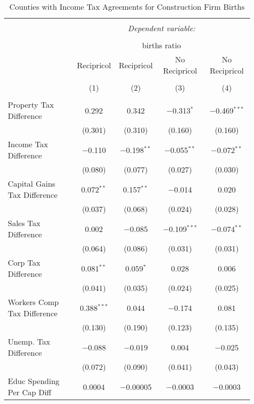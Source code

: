 
\begin{table}[!htbp] \centering 
  \caption{Counties with Income Tax Agreements for  Construction Firm Births} 
  \label{23agreement} 
\begin{tabular}{@{\extracolsep{5pt}}lcccc} 
\\[-1.8ex]\hline 
\hline \\[-1.8ex] 
 & \multicolumn{4}{c}{\textit{Dependent variable:}} \\ 
\cline{2-5} 
\\[-1.8ex] & \multicolumn{4}{c}{births ratio} \\ 
 & Recipricol & Recipricol & No Recipricol & No Recipricol \\ 
\\[-1.8ex] & (1) & (2) & (3) & (4)\\ 
\hline \\[-1.8ex] 
 Property Tax Difference & 0.292 & 0.342 & $-$0.313$^{*}$ & $-$0.469$^{***}$ \\ 
  & (0.301) & (0.310) & (0.160) & (0.160) \\ 
  Income Tax Difference & $-$0.110 & $-$0.198$^{**}$ & $-$0.055$^{**}$ & $-$0.072$^{**}$ \\ 
  & (0.080) & (0.077) & (0.027) & (0.030) \\ 
  Capital Gains Tax Difference & 0.072$^{**}$ & 0.157$^{**}$ & $-$0.014 & 0.020 \\ 
  & (0.037) & (0.068) & (0.024) & (0.028) \\ 
  Sales Tax Difference & 0.002 & $-$0.085 & $-$0.109$^{***}$ & $-$0.074$^{**}$ \\ 
  & (0.064) & (0.086) & (0.031) & (0.031) \\ 
  Corp Tax Difference & 0.081$^{**}$ & 0.059$^{*}$ & 0.028 & 0.006 \\ 
  & (0.041) & (0.035) & (0.024) & (0.025) \\ 
  Workers Comp Tax Difference & 0.388$^{***}$ & 0.044 & $-$0.174 & 0.081 \\ 
  & (0.130) & (0.190) & (0.123) & (0.135) \\ 
  Unemp. Tax Difference & $-$0.088 & $-$0.019 & 0.004 & $-$0.025 \\ 
  & (0.072) & (0.090) & (0.041) & (0.043) \\ 
  Educ Spending Per Cap Diff & 0.0004 & $-$0.00005 & $-$0.0003 & $-$0.0003 \\ 

\end{tabular}
\end{table}
